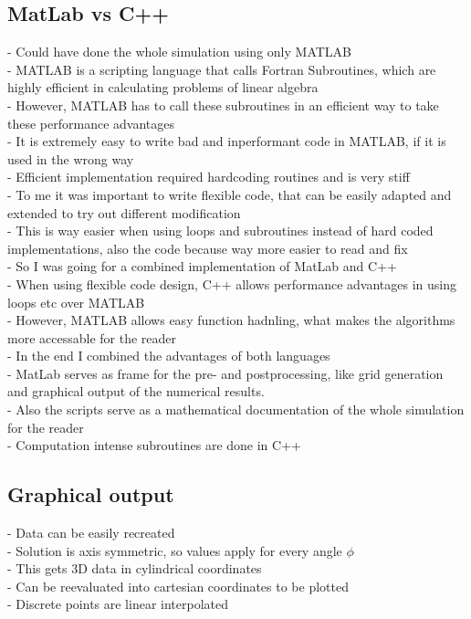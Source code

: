 \documentclass[parskip=half, titlepage=yes, 12pt, BCOR=12mm, DIV=calc]{scrartcl}
\begin{document}
\subsection{MatLab vs C++}
- Could have done the whole simulation using only MATLAB \\
- MATLAB is a scripting language that calls Fortran Subroutines, which are highly efficient in calculating problems of linear algebra \\
- However, MATLAB has to call these subroutines in an efficient way to take these performance advantages \\
- It is extremely easy to write bad and inperformant code in MATLAB, if it is used in the wrong way \\
- Efficient implementation required hardcoding routines and is very stiff \\ 
- To me it was important to write flexible code, that can be easily adapted and extended to try out different modification \\
- This is way easier when using loops and subroutines instead of hard coded implementations, also the code because way more easier to read and fix \\
- So I was going for a combined implementation of MatLab and C++ \\ 
- When using flexible code design, C++ allows performance advantages in using loops etc over MATLAB \\
- However, MATLAB allows easy function hadnling, what makes the algorithms more accessable for the reader \\ 
- In the end I combined the advantages of both languages \\
- MatLab serves as frame for the pre- and postprocessing, like grid generation and graphical output of the numerical results. \\
- Also the scripts serve as a mathematical documentation of the whole simulation for the reader \\
- Computation intense subroutines are done in C++ \\


\subsection{Graphical output}
- Data can be easily recreated \\
- Solution is axis symmetric, so values apply for every angle $\phi$ \\
- This gets 3D data in cylindrical coordinates \\
- Can be reevaluated into cartesian coordinates to be plotted \\
- Discrete points are linear interpolated \\
\end{document}
